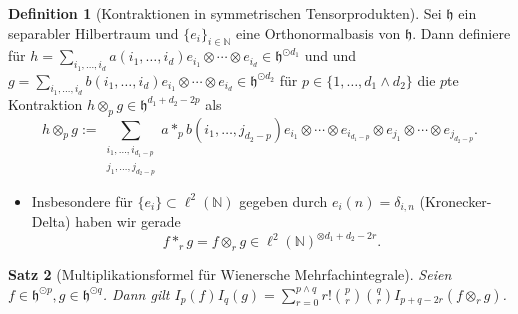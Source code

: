 \documentclass[11pt, ngerman]{scrartcl}
\theoremstyle{definition}
\newtheorem{definition}{Definition}
\theoremstyle{plain}
\newtheorem{satz}[definition]{Satz}
\newcommand{\N}[0]{\mathbb{N}}
\newcommand{\Hil}[0]{\mathfrak{h}}
\newcommand{\<}{\langle}
\renewcommand{\>}{\rangle}
\begin{document}
    \begin{definition}[Kontraktionen in symmetrischen Tensorprodukten]
            Sei $\Hil$ ein separabler Hilbertraum und $\{e_i\}_{i \in \N}$ eine Orthonormalbasis von $\Hil$. Dann definiere für $h = \sum_{i_1, \ldots, i_d} a(i_1, \ldots, i_d) e_{i_1} \otimes \cdots \otimes e_{i_d} \in \Hil^{\odot d_1}$ und und $g = \sum_{i_1, \ldots, i_d} b(i_1, \ldots, i_d) e_{i_1} \otimes \cdots \otimes e_{i_d} \in \Hil^{\odot d_2}$ für $p \in \{1, \ldots, d_1 \wedge d_2\}$ die $p$te Kontraktion $h \otimes_p g \in \Hil^{d_1 + d_2 - 2p}$  als \[
            h \otimes_p g := \sum_{\substack{i_1, \ldots, i_{d_1 - p} \\ j_1, \ldots, j_{d_2 - p}}} a *_p b(i_1, \ldots, j_{d_2 - p}) e_{i_1} \otimes \cdots \otimes e_{i_{d_1 - p}} \otimes e_{j_1} \otimes \cdots \otimes e_{j_{d_2 - p}}.
            \]
            \begin{itemize}
            \item Insbesondere für $\{e_i\} \subset \ell^2(\N)$ gegeben durch $e_i(n) = \delta_{i,n}$ (Kronecker-Delta) haben wir gerade \[f *_r g = f \otimes_r g \in \ell^2(\N)^{\otimes d_1 + d_2 - 2r}.\]
            \end{itemize}
        \end{definition}
        
  \begin{satz}[Multiplikationsformel für Wienersche Mehrfachintegrale]
    Seien $f \in \Hil^{\odot p}, g \in \Hil^{\odot q}$. Dann gilt $I_p(f)I_q(g) = \sum_{r=0}^{p \wedge q} r! \binom{p}{r}\binom{q}{r}I_{p+q-2r}(f \otimes_r g)$.
  \end{satz}
\end{document}
